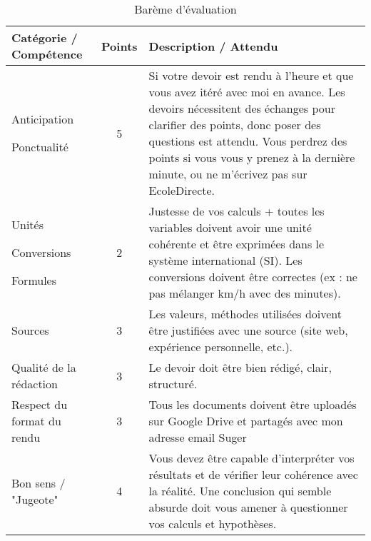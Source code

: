 \documentclass[a4paper,12pt]{article}
\begin{document}
\begin{table}[H]
  \centering
  \renewcommand{\arraystretch}{1.3} %
  \begin{tabular}{|m{5cm}|c|m{9cm}|}
      \hline
      \textbf{Catégorie / Compétence} & \textbf{Points} & \textbf{Description / Attendu} \\
      \hline
      Anticipation \par Ponctualité & 5 & Si votre devoir est rendu à l'heure et que vous avez itéré avec moi en avance. Les devoirs nécessitent des échanges pour clarifier des points, donc poser des questions est attendu. Vous perdrez des points si vous vous y prenez à la dernière minute, ou ne m'écrivez pas sur EcoleDirecte. \\
      \hline
      Unités \par Conversions \par Formules & 2 & Justesse de vos calculs + toutes les variables doivent avoir une unité cohérente et être exprimées dans le système international (SI). Les conversions doivent être correctes (ex : ne pas mélanger km/h avec des minutes). \\
      \hline
      Sources & 3 & Les valeurs, méthodes utilisées doivent être justifiées avec une source (site web, expérience personnelle, etc.). \\
      \hline
      Qualité de la rédaction & 3 & Le devoir doit être bien rédigé, clair, structuré. \\
      \hline
      Respect du format du rendu & 3 & Tous les documents doivent être uploadés sur Google Drive et partagés avec mon adresse email Suger \\
      \hline
      Bon sens / "Jugeote" & 4 & Vous devez être capable d'interpréter vos résultats et de vérifier leur cohérence avec la réalité. Une conclusion qui semble absurde doit vous amener à questionner vos calculs et hypothèses. \\
      \hline
  \end{tabular}
  \caption{Barème d'évaluation}
  \label{tab:bareme}
\end{table}
\end{document}

